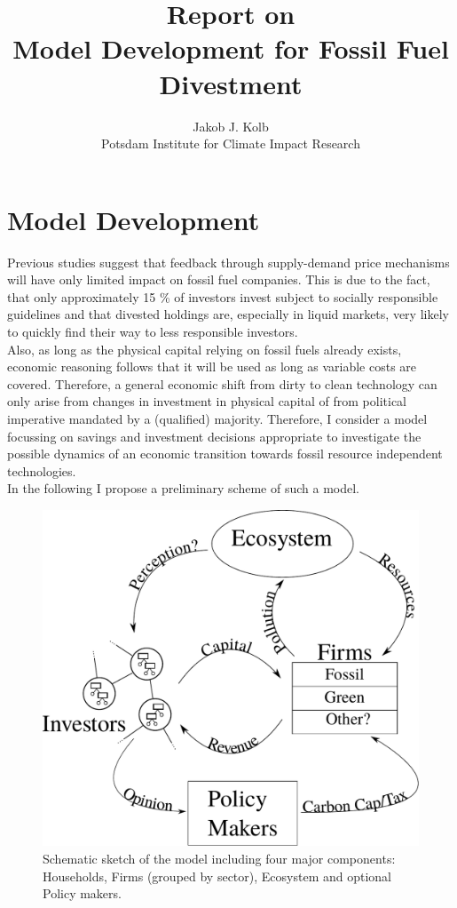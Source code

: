 \title{Report on \\ Model Development for Fossil Fuel Divestment}
\author{Jakob J. Kolb \\ Potsdam Institute for Climate Impact Research}

\maketitle

\section{Model Development}

Previous studies \cite{Ans2013} suggest that feedback through supply-demand price mechanisms will have only limited impact on fossil fuel companies. This is due to the fact, that only approximately 15 \% of investors invest subject to socially responsible guidelines \cite{SIF2014Report} and that divested holdings are, especially in liquid markets, very likely to quickly find their way to less responsible investors. \\
Also, as long as the physical capital relying on fossil fuels already exists, economic reasoning follows that it will be used as long as variable costs are covered.
Therefore, a general economic shift from dirty to clean technology can only arise from changes in investment in physical capital of from political imperative mandated by a (qualified) majority. Therefore, I consider a model focussing on savings and investment decisions appropriate to investigate the possible dynamics of an economic transition towards fossil resource independent technologies.\\
In the following I propose a preliminary scheme of such a model.

\begin{figure}[h]
	\centering
	\includegraphics[width =.7 \textwidth]{figures/Model_Scheme.pdf}
	\caption{Schematic sketch of the model including four major components: Households, Firms (grouped by sector), Ecosystem and optional Policy makers.}
	\label{fig:model}
\end{figure}

